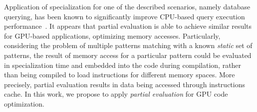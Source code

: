 \documentclass[sigplan]{acmart}\settopmatter{printacmref=false, printfolios=false}
\begin{document}
Application of specialization for one of the described scenarios, namely database querying, has been known to significantly improve CPU-based query execution performance~\cite{10.1007/978-3-319-74313-4_27}. It appears that partial evaluation is able to achieve similar results for GPU-based applications, optimizing memory accesses.
Particularly, considering the problem of multiple patterns matching with a known \emph{static} set of patterns, the result of memory access for a particular pattern could be evaluated in specialization time and embedded into the code during compilation, rather than being compiled to load instructions for different memory spaces.
More precisely, partial evaluation results in data being accessed through instructions cache.
In this work, we propose to apply \emph{partial evaluation} for GPU code optimization.


\end{document}
